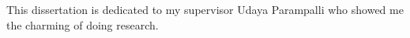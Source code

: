 
\begin{dedication} 

This dissertation is dedicated to my supervisor Udaya Parampalli who showed me the charming of doing research.

\end{dedication}

